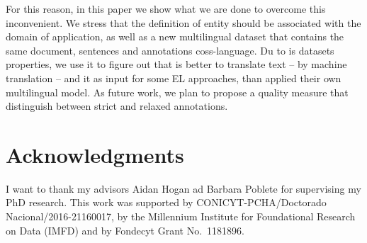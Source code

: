 \documentclass[sigconf]{acmart}
\begin{document}
For this reason, in this paper we show what we are done to overcome this inconvenient. We stress that the definition of entity should be associated with the domain of application, as well as a new multilingual dataset that contains the same document, sentences and annotations coss-language. Du to is datasets properties, we use it to figure out that is better to translate text -- by machine translation -- and it as input for some EL approaches, than applied their own multilingual model. As future work, we plan to propose a quality measure that distinguish between strict and relaxed annotations. 

\section{Acknowledgments}
I want to thank my advisors Aidan Hogan ad Barbara Poblete for supervising my PhD research. This work was supported by CONICYT-PCHA/Doctorado Nacional/2016-21160017, by the Millennium Institute for Foundational Research on Data (IMFD) and by Fondecyt Grant No.\ 1181896.

%


\end{document}
